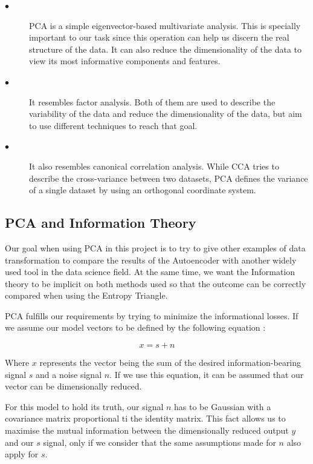 \begin{description}
	
	\item[$\bullet$] PCA is a simple eigenvector-based multivariate analysis. This is specially important to our task since this operation can help us discern the real structure of the data. It can also reduce the dimensionality of the data to view its most informative components and features.
	
	\item[$\bullet$] It resembles factor analysis. Both of them are used to describe the variability of the data and reduce the dimensionality of the data, but aim to use different techniques to reach that goal.
	
	\item[$\bullet$] It also resembles canonical correlation analysis. While CCA tries to describe the cross-variance between two datasets, PCA defines the variance of a single dataset by using an orthogonal coordinate system.
	
\end{description}

\subsection{PCA and Information Theory}

Our goal when using PCA in this project is to try to give other examples of data transformation to compare the results of the Autoencoder with another widely used tool in the data science field. At the same time, we want the Information theory to be implicit on both methods used so that the outcome can be correctly compared when using the Entropy Triangle.\par

PCA fulfills our requirements by trying to minimize the informational losses. If we assume our model vectors to be defined by the  following equation :

\begin{equation}\label{eq:pca_equation}
x = s + n 
\end{equation}

Where $x$ represents the vector being the sum of the desired information-bearing signal $s$ and a noise signal $n$. If we use this equation, it can be assumed that our vector can be dimensionally reduced.\par

For this model to hold its truth, our signal $n$ has to be Gaussian with a covariance matrix proportional ti the identity matrix. This fact allows us to maximise the mutual information between the dimensionally reduced output $y$ and our $s$ signal, only if we consider that the same assumptions made for $n$ also apply for $s$. \par

